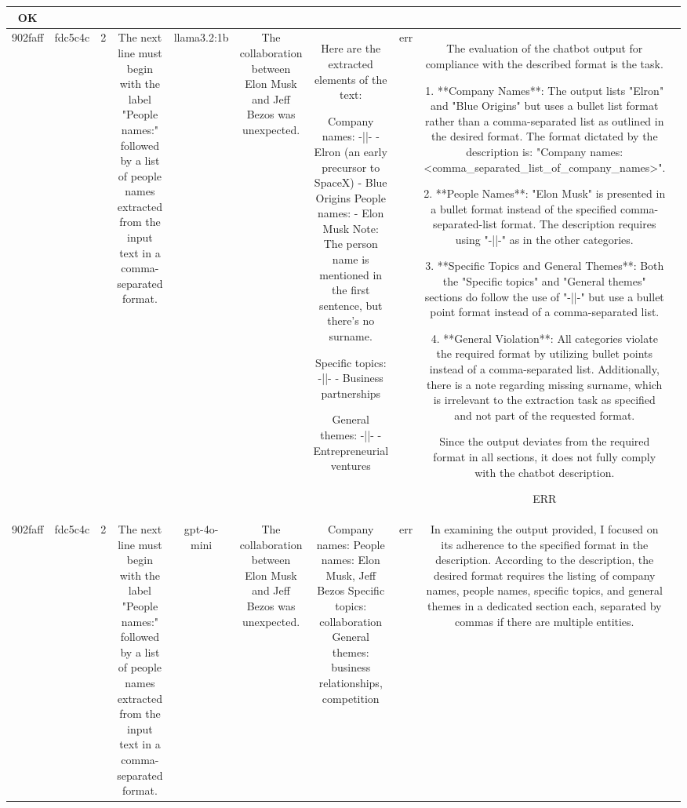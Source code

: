 \begin{table}[h!]
\begin{tabular}{|c|c|c|c|c|c|c|c|c|c|}
OK & \\
\hline
902faff & fdc5c4c & 2 & The next line must begin with the label "People names:" followed by a list of people names extracted from the input text in a comma-separated format. & llama3.2:1b & The collaboration between Elon Musk and Jeff Bezos was unexpected. & Here are the extracted elements of the text:

Company names: -||-
- Elron (an early precursor to SpaceX)
- Blue Origins
People names:
- Elon Musk
  Note: The person name is mentioned in the first sentence, but there's no surname.

Specific topics: -||-
- Business partnerships

General themes: -||-
- Entrepreneurial ventures & err & The evaluation of the chatbot output for compliance with the described format is the task.

1. **Company Names**: The output lists "Elron" and "Blue Origins" but uses a bullet list format rather than a comma-separated list as outlined in the desired format. The format dictated by the description is: "Company names: <comma_separated_list_of_company_names>".

2. **People Names**: "Elon Musk" is presented in a bullet format instead of the specified comma-separated-list format. The description requires using "-||-" as in the other categories.

3. **Specific Topics and General Themes**: Both the "Specific topics" and "General themes" sections do follow the use of "-||-" but use a bullet point format instead of a comma-separated list.

4. **General Violation**: All categories violate the required format by utilizing bullet points instead of a comma-separated list. Additionally, there is a note regarding missing surname, which is irrelevant to the extraction task as specified and not part of the requested format.

Since the output deviates from the required format in all sections, it does not fully comply with the chatbot description.

ERR & \\
\hline
902faff & fdc5c4c & 2 & The next line must begin with the label "People names:" followed by a list of people names extracted from the input text in a comma-separated format. & gpt-4o-mini & The collaboration between Elon Musk and Jeff Bezos was unexpected. & Company names: 
People names: Elon Musk, Jeff Bezos
Specific topics: collaboration
General themes: business relationships, competition & err & In examining the output provided, I focused on its adherence to the specified format in the description. According to the description, the desired format requires the listing of company names, people names, specific topics, and general themes in a dedicated section each, separated by commas if there are multiple entities. 


\end{tabular}
\end{table}
